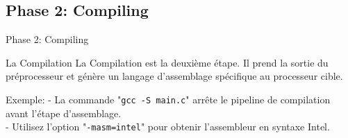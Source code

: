 \documentclass{beamer}
\begin{document}
\begin{darkframes}
  	\subsection{Phase 2: Compiling}
  	\begin{frame}{Phase 2: Compiling}
	  	\begin{block}{La Compilation}
	  		La \alert{Compilation} est la deuxième étape. Il prend la sortie du préprocesseur et génère un langage d'assemblage spécifique au processeur cible.
	  	\end{block}
		\begin{exampleblock}{Exemple:}
			- La commande "\texttt{gcc -S main.c}" arrête le pipeline de compilation avant l'étape d'assemblage.\\
			- Utilisez l'option "\texttt{-masm=intel}" pour obtenir l'assembleur en syntaxe Intel.
		\end{exampleblock}
  	\end{frame}
  

\end{darkframes}
\end{document}
